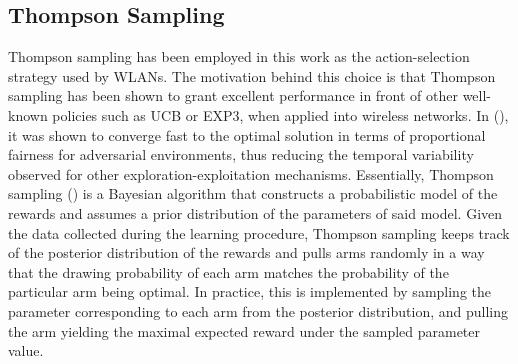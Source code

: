 \documentclass[preprint,12pt]{elsarticle}
\begin{document}
\subsection{Thompson Sampling}
\label{subsection:thompson_sampling}
Thompson sampling has been employed in this work as the action-selection strategy used by WLANs. The motivation behind this choice is that Thompson sampling has been shown to grant excellent performance in front of other well-known policies such as UCB or EXP3, when applied into wireless networks. In (\citealp{wilhelmi2017collaborative}), it was shown to converge fast to the optimal solution in terms of proportional fairness for adversarial environments, thus reducing the temporal variability observed for other exploration-exploitation mechanisms. Essentially, Thompson sampling (\citealp{thompson1933likelihood}) is a Bayesian algorithm that constructs a probabilistic model of the rewards and assumes a prior distribution of the parameters of said model. Given the data collected during the learning procedure, Thompson sampling keeps track of the posterior distribution of the rewards and pulls arms randomly in a way that the drawing probability of each arm matches the probability of the particular arm being optimal. In practice, this is implemented by sampling the parameter corresponding to each arm from the posterior distribution, and pulling the arm yielding the maximal expected reward under the sampled parameter value. 
\end{document}
